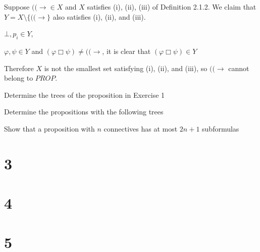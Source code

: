 \documentclass{article}
\begin{document}
\noindent Suppose $(( \to \in X$ and $X$ satisfies (i), (ii), (iii) of Definition 2.1.2. We claim that $Y = X\text{\textbackslash} \{ ((\to \}$ also satisfies (i), (ii), and (iii). 
\begin{description*}
\item[\hspace{2em}(i)] $\bot, p_i \in Y$, 
\item[\hspace{2em}(ii)] $\varphi , \psi \in Y$ and $(\varphi \Box \psi) \neq ((\to $, it is clear that $(\varphi \Box \psi) \in Y $
\item[\hspace{2em}(iii)]
\end{description*}
Therefore $X$ is not the smallest set satisfying (i), (ii), and (iii), so $((\to $ cannot belong to $PROP$.

\begin{description*}
	\item[7. (a)] Determine the trees of the proposition in Exercise 1
	\item[\hspace{1.2em}(b)] Determine the propositions with the following trees
\end{description*}

\begin{description*}
	\item[9.] Show that a proposition with $n$ connectives has at most $2n + 1$ subformulas
\end{description*}


\section*{3}



\section*{4}




\section*{5}
\end{document}
